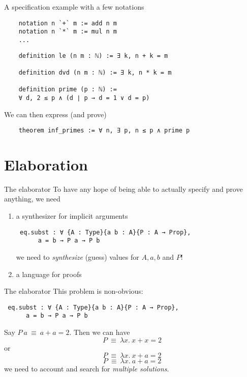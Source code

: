 \documentclass{beamer}
\begin{document}
\begin{frame}[fragile]{A specification example}
  with a few notations
  \begin{lstlisting}
    notation n `+` m := add n m
    notation n `*` m := mul n m
    ...
  \end{lstlisting}
  \begin{lstlisting}
    definition le (n m : ℕ) := ∃ k, n + k = m
    
    definition dvd (n m : ℕ) := ∃ k, n * k = m
    
    definition prime (p : ℕ) :=
    ∀ d, 2 ≤ p ∧ (d ∣ p → d = 1 ∨ d = p)
  \end{lstlisting}
  We can then express (and prove)
  
  \begin{lstlisting}
    theorem inf_primes := ∀ n, ∃ p, n ≤ p ∧ prime p
  \end{lstlisting}
\end{frame}

\section{Elaboration}

\begin{frame}[fragile]{The elaborator}
  To have any hope of being able to actually specify and prove
  anything, we need
  \begin{enumerate}
  \item a synthesizer for implicit arguments
    \begin{lstlisting}
 eq.subst : ∀ {A : Type}{a b : A}{P : A → Prop},
      a = b → P a → P b
    \end{lstlisting}
    we need to \emph{synthesize} (guess) values for $A, a, b$ and $P$!
    
  \item a language for proofs
  \end{enumerate}
\end{frame}

\begin{frame}[fragile]{The elaborator}
  This problem is non-obvious:
    \begin{lstlisting}
 eq.subst : ∀ {A : Type}{a b : A}{P : A → Prop},
      a = b → P a → P b
    \end{lstlisting}

    Say $P\ a\ \equiv\ a + a = 2$. Then we can have
    \[P\ \equiv\ \lambda x.\ x+x = 2\]
    or
    \[P\ \equiv\ \lambda x.\ x+a = 2\]
    \[P\ \equiv\ \lambda x.\ a+a = 2\]
    we need to account and search for \emph{multiple solutions}.
\end{frame}
\end{document}

